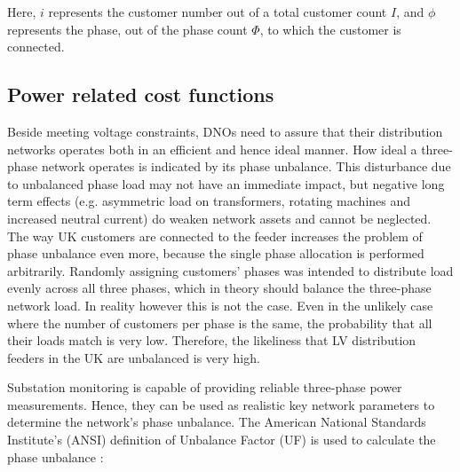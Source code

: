 

Here, $i$ represents the customer number out of a total customer count $I$, and $\phi$ represents the phase, out of the phase count $\Phi$, to which the customer is connected.

\subsection{Power related cost functions}
\label{ch1:subsec:powers-related-cost-functions}

Beside meeting voltage constraints, DNOs need to assure that their distribution networks operates both in an efficient and hence ideal manner.
How ideal a three-phase network operates is indicated by its phase unbalance.
This disturbance due to unbalanced phase load may not have an immediate impact, but negative long term effects (e.g. asymmetric load on transformers, rotating machines and increased neutral current) do weaken network assets and cannot be neglected.
The way UK customers are connected to the feeder increases the problem of phase unbalance even more, because the single phase allocation is performed arbitrarily.
Randomly assigning customers' phases was intended to distribute load evenly across all three phases, which in theory should balance the three-phase network load.
In reality however this is not the case.
Even in the unlikely case where the number of customers per phase is the same, the probability that all their loads match is very low.
Therefore, the likeliness that LV distribution feeders in the UK are unbalanced is very high.


Substation monitoring is capable of providing reliable three-phase power measurements.
Hence, they can be used as realistic key network parameters to determine the network's phase unbalance.
The American National Standards Institute's (ANSI) definition of Unbalance Factor (UF) is used to calculate the phase unbalance \cite{ANSI-MB-1-2011}:


